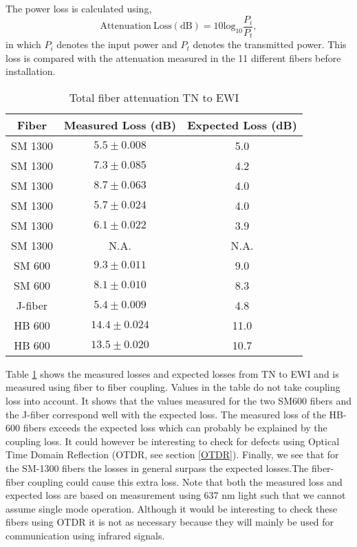 The power loss is calculated using,
\begin{equation}
\mathrm{Attenuation \:  Loss  (dB)} = 10 \mathrm{log_{10}} \frac{P_i}{P_t},
\end{equation}
in which $P_i$ denotes the input power and $P_t$ denotes the transmitted power. This loss is compared with the attenuation measured in the 11 different fibers before installation. 

\begin{table}[hbt]
\caption{Total fiber attenuation TN to EWI}
\label{tab:TNEWI}
\centering
\begin{tabular}{|c|c|c|}
\hline
Fiber & Measured Loss (dB) & Expected Loss (dB) \\ \hline
SM 1300 & $5.5 \pm 0.008$  & 5.0 \\ \hline
SM 1300 & $7.3 \pm 0.085$  & 4.2 \\ \hline
SM 1300 & $8.7 \pm 0.063$  & 4.0 \\ \hline
SM 1300 & $5.7 \pm 0.024$  & 4.0 \\ \hline
SM 1300 & $6.1 \pm 0.022$  & 3.9 \\ \hline
SM 1300 & N.A. & N.A. \\ \hline
SM 600 & $9.3 \pm 0.011$  & 9.0 \\ \hline
SM 600 & $8.1 \pm 0.010$  & 8.3 \\ \hline
J-fiber & $5.4 \pm 0.009 $  & 4.8 \\ \hline
HB 600 & $14.4 \pm 0.024$  & 11.0 \\ \hline
HB 600 & $13.5 \pm 0.020$ & 10.7 \\ \hline
\end{tabular}
\end{table}

Table \ref{tab:TNEWI} shows the measured losses  and expected losses from TN to EWI and is measured using fiber to fiber coupling. Values in the table do not take coupling loss into account. It shows that the values measured for the two SM600 fibers and the J-fiber correspond well with the expected loss. The measured loss of the HB-600 fibers exceeds the expected loss which can probably be explained by the coupling loss. It could however be interesting to check for defects using Optical Time Domain Reflection (OTDR, see section \ref{OTDR}). Finally, we see that for the SM-1300 fibers the losses in general surpass the expected losses.The fiber-fiber coupling could cause this extra loss. Note that both the measured loss and expected loss are based on measurement using 637 nm light such that we cannot assume single mode operation. Although it would be interesting to check these fibers using OTDR it is not as necessary because they will mainly be used for communication using infrared signals.

